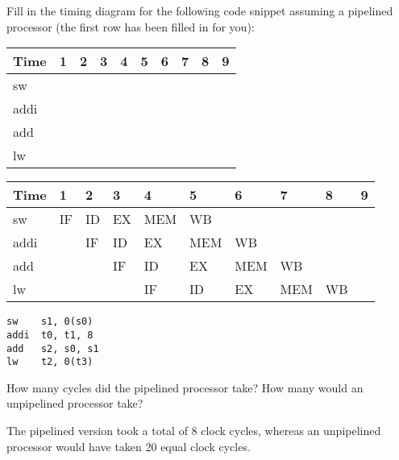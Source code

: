 \begin{blocksection}
\question Fill in the timing diagram for the following code snippet assuming a pipelined processor (the first row has been filled in for you):

\begin{tabular}{ |l|l|l|l|l|l|l|l|l|l| } 
 \hline
 Time & 1 & 2 & 3 & 4 & 5 & 6 & 7 & 8 & 9 \\
 \hline
 sw & & & & & & & & & \\
 \hline
 addi & & & & & & & & & \\
 \hline
 add & & & & & & & & & \\
 \hline
 lw & & & & & & & & & \\
 \hline
\end{tabular}

\begin{solution}
\begin{tabular}{ |l|l|l|l|l|l|l|l|l|l| } 
 \hline
 Time & 1 & 2 & 3 & 4 & 5 & 6 & 7 & 8 & 9 \\
 \hline
 sw & IF & ID & EX & MEM & WB & & & & \\
 \hline
 addi & & IF & ID & EX & MEM & WB & & & \\
 \hline
 add & & & IF & ID & EX & MEM & WB & & \\
 \hline
 lw & & & & IF & ID & EX & MEM & WB & \\
 \hline
\end{tabular}
\end{solution}

\begin{verbatim}
sw	  s1, 0(s0)
addi  t0, t1, 8
add   s2, s0, s1
lw	  t2, 0(t3)
\end{verbatim}

How many cycles did the pipelined processor take? How many would an unpipelined processor take?

\begin{solution}[0.5in]
The pipelined version took a total of 8 clock cycles, whereas an unpipelined processor would have taken 20 equal clock cycles.
\end{solution}
\end{blocksection}